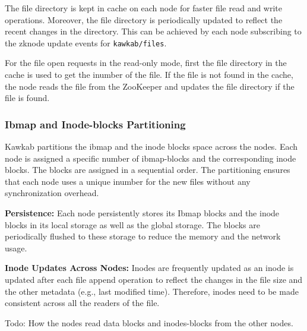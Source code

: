 \documentclass[]{article}
\newcommand{\subtopic}[1]{\vspace{1.5pt} \noindent \textbf{#1}}
\newcommand{\hl}[1]{\textcolor{hlcolor}{#1}}
\begin{document}
The file directory is kept in cache on each node for faster file read and write
operations. Moreover, the file directory is periodically updated to reflect the
recent changes in the directory. This can be achieved by each node subscribing
to the zknode update events for \texttt{kawkab/files}.

For the file open requests in the read-only mode, first the file directory in
the cache is used to get the inumber of the file. If the file is not found in
the cache, the node reads the file from the ZooKeeper and updates the file
directory if the file is found.



\subsubsection{Ibmap and Inode-blocks Partitioning} Kawkab partitions the ibmap
and the inode blocks space across the nodes. Each node is assigned a specific
number of ibmap-blocks and the corresponding inode blocks.
The blocks are assigned in a sequential order. The partitioning ensures that
each node uses a unique inumber for the new files without any synchronization
overhead.

\subtopic{Persistence:} Each node persistently stores its Ibmap blocks and the
inode blocks in its local storage as well as the global storage. The blocks are
periodically flushed to these storage to reduce the memory and the network usage.

\subtopic{Inode Updates Across Nodes:} Inodes are frequently updated as an inode is
updated after each file append operation to reflect the changes in the file
size and the other metadata (e.g., last modified time).  Therefore, inodes need
to be made consistent across all the readers of the file.

\hl{Todo: How the nodes read data blocks and inodes-blocks from the other nodes.}

\end{document}

